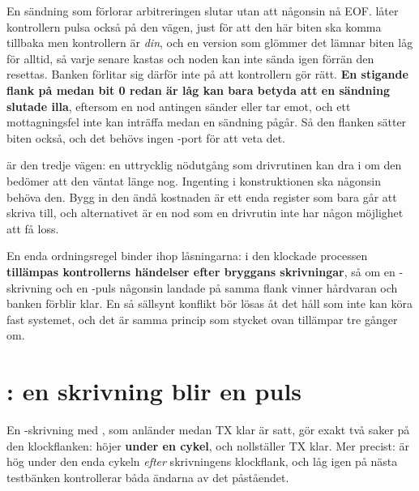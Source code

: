 \begin{aside}
En sändning som förlorar arbitreringen slutar utan att någonsin nå EOF.  låter
kontrollern pulsa  också på den vägen, just för att den här biten ska komma tillbaka
\textemdash{} men kontrollern är \emph{din}, och en version som glömmer det lämnar biten låg för
alltid, så varje senare  kastas och noden kan inte sända igen förrän den resettas.
Banken förlitar sig därför inte på att kontrollern gör rätt. \textbf{En stigande flank på
 medan bit 0 redan är låg kan bara betyda att en sändning slutade illa}, eftersom en nod
antingen sänder eller tar emot, och ett mottagningsfel inte kan inträffa medan en sändning pågår. Så
den flanken sätter biten också, och det behövs ingen -port för att veta det.

 är den tredje vägen: en uttrycklig nödutgång som drivrutinen kan dra i om den bedömer
att den väntat länge nog. Ingenting i konstruktionen ska någonsin behöva den. Bygg in den ändå
\textemdash{} kostnaden är ett enda register som bara går att skriva till, och alternativet är en nod
som en drivrutin inte har någon möjlighet att få loss.
\end{aside}

En enda ordningsregel binder ihop låsningarna: i den klockade processen \textbf{tillämpas
kontrollerns händelser efter bryggans skrivningar}, så om en -skrivning och en
-puls någonsin landade på samma flank vinner hårdvaran och banken förblir klar. En så
sällsynt konflikt bör lösas åt det håll som inte kan köra fast systemet, och det är samma princip som
stycket ovan tillämpar tre gånger om.

\section{: en skrivning blir en puls}
\label{c18:sec:txsend}

En -skrivning med , som anländer medan TX klar är satt, gör
exakt två saker på den klockflanken: höjer  \textbf{under en cykel}, och nollställer TX
klar. Mer precist:  är hög under den enda cykeln \emph{efter} skrivningens klockflank,
och låg igen på nästa \textemdash{} testbänken kontrollerar båda ändarna av det påståendet.

